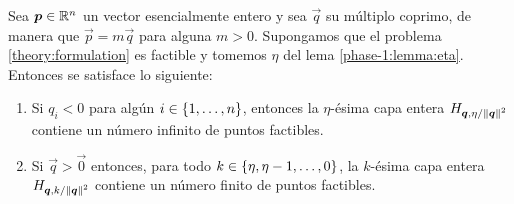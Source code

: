 \begin{theorem}
	\label{theory:th:feasibility}
	Sea $\boldsymbol{p} \in \mathbb{R}^n$ un vector esencialmente entero y sea
	$\vec{q}$ su múltiplo coprimo, de manera que $\vec{p} = m\vec{q}$ para alguna $m > 0$.
	Supongamos que el problema \eqref{theory:formulation} es factible y tomemos $\eta$ del lema
	\ref{phase-1:lemma:eta}. Entonces se satisface lo siguiente: \begin{enumerate}
		\item Si $q_i < 0$ para algún $i \in \lbrace 1, \ldots, n \rbrace$, entonces la $\eta$-ésima
			capa entera $H_{\boldsymbol{q}, \eta/\left\lVert \boldsymbol{q} \right\rVert^{2}}$ contiene un número infinito de puntos factibles.
		\item Si $\vec{q} > \vec{0}$ entonces, para todo $k \in \lbrace \eta, \eta - 1, \ldots, 0 \rbrace$,
			la $k$-ésima capa entera $H_{\boldsymbol{q}, k/\left\lVert \boldsymbol{q} \right\rVert^{2}}$ contiene un número finito de puntos factibles.
	\end{enumerate}
\end{theorem}
